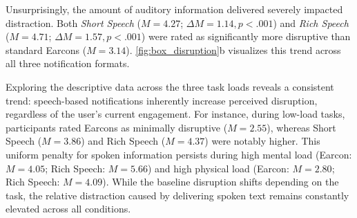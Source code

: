 Unsurprisingly, the amount of auditory information delivered severely impacted distraction. Both \textit{Short Speech} ($M = 4.27$; $\Delta M = 1.14, p < .001$) and \textit{Rich Speech} ($M = 4.71$; $\Delta M = 1.57, p < .001$) were rated as significantly more disruptive than standard Earcons ($M = 3.14$). \autoref{fig:box_disruption}b visualizes this trend across all three notification formats.

Exploring the descriptive data across the three task loads reveals a consistent trend: speech-based notifications inherently increase perceived disruption, regardless of the user's current engagement. For instance, during low-load tasks, participants rated Earcons as minimally disruptive ($M = 2.55$), whereas Short Speech ($M = 3.86$) and Rich Speech ($M = 4.37$) were notably higher. This uniform penalty for spoken information persists during high mental load (Earcon: $M = 4.05$; Rich Speech: $M = 5.66$) and high physical load (Earcon: $M = 2.80$; Rich Speech: $M = 4.09$). While the baseline disruption shifts depending on the task, the relative distraction caused by delivering spoken text remains constantly elevated across all conditions.

